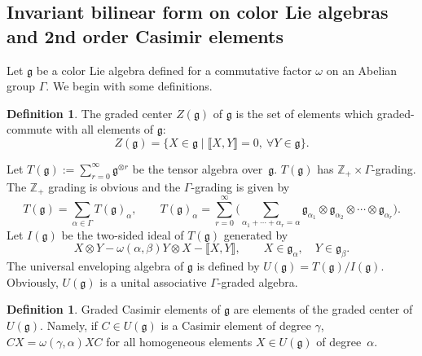 \documentclass[pdftex]{sigma}
\numberwithin{equation}{section}
\theoremstyle{definition}
\newtheorem{Definition}[Theorem]{Definition}
\def\g{\mathfrak{g}}
\begin{document}
\subsection[Invariant bilinear form on color Lie algebras and 2nd order Casimir elements]{Invariant bilinear form on color Lie algebras\\ and 2nd order Casimir elements}

Let $\g$ be a color Lie algebra defined for a commutative factor $\omega$ on an Abelian group $\Gamma$.
We begin with some definitions.

\begin{Definition}\label{DEF:gcenter}
	The graded center $Z(\g)$ of $\g$ is the set of elements which graded-commute with all elements of $\g$:
	\begin{equation*}
		Z(\g) = \{ X \in \g \mid \llbracket X, Y \rrbracket = 0, \ \forall Y \in \g \}.
	\end{equation*}
\end{Definition}

Let $T(\g) := \sum_{r=0}^{\infty	} \g^{\otimes r} $ be the tensor algebra over~$\g$.
$T(\g)$ has $ \mathbb{Z}_+ \times \Gamma$-grading. The $\mathbb{Z}_+$ grading is obvious and the $\Gamma$-grading is given by
\begin{equation*}
	T(\g) = \sum_{\alpha\in \Gamma} T(\g)_{\alpha},
	\qquad
	T(\g)_{\alpha} = \sum_{r=0}^{\infty}\biggl( \sum_{\alpha_1+ \cdots + \alpha_r = \alpha} \g_{\alpha_1} \otimes \g_{\alpha_2} \otimes \cdots \otimes \g_{\alpha_r} \biggr).
\end{equation*}
Let $I(\g)$ be the two-sided ideal of $T(\g)$ generated by
\begin{equation*}
	X \otimes Y - \omega(\alpha,\beta) Y \otimes X - \llbracket X, Y \rrbracket, \qquad X \in \g_{\alpha},\quad Y \in \g_{\beta}.
\end{equation*}
The universal enveloping algebra of $\g$ is defined by $U(\g) = T(\g)/I(\g).$
Obviously, $U(\g)$ is a unital associative $\Gamma$-graded algebra.

\begin{Definition}
	Graded Casimir elements of $\g$ are elements of the graded center of $U(\g)$.
	Namely, if $C \in U(\g)$ is a Casimir element of degree $\gamma$, $ C X = \omega(\gamma, \alpha) XC $ for all homogeneous elements $ X \in U(\g) $ of degree~$\alpha$.
\end{Definition}
\end{document}
